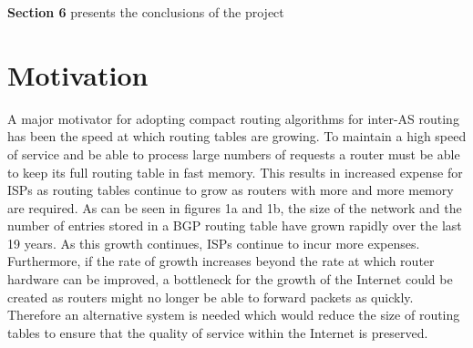 \documentclass{mpaper}
\begin{document}
\textbf{Section 6} presents the conclusions of the project \newline


\section{Motivation}

A major motivator for adopting compact routing algorithms for inter-AS routing has been the speed at which routing tables are growing. To maintain a high speed of service and be able to process large numbers of requests a router must be able to keep its full routing table in fast memory. This results in increased expense for ISPs as routing tables continue to grow as routers with more and more memory are required. As can be seen in figures 1a and 1b, the size of the network and the number of entries stored in a BGP routing table have grown rapidly over the last 19 years. As this growth continues, ISPs continue to incur more expenses. Furthermore, if the rate of growth increases beyond the rate at which router hardware can be improved, a bottleneck for the growth of the Internet could be created as routers might no longer be able to forward packets as quickly. Therefore an alternative system is needed which would reduce the size of routing tables to ensure that the quality of service within the Internet is preserved. 
\end{document}
